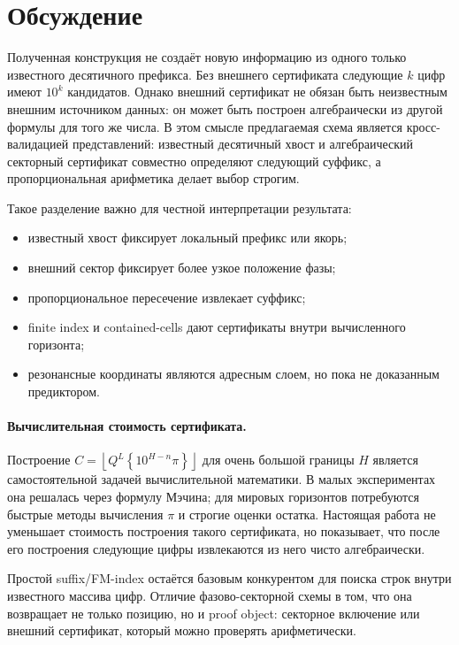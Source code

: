 \documentclass[11pt,a4paper]{article}
\newcommand{\fracpart}[1]{\left\{#1\right\}}
\newcommand{\floor}[1]{\left\lfloor #1 \right\rfloor}
\begin{document}
\section{Обсуждение}

Полученная конструкция не создаёт новую информацию из одного только известного десятичного префикса.  Без внешнего сертификата следующие $k$ цифр имеют $10^k$ кандидатов.  Однако внешний сертификат не обязан быть неизвестным внешним источником данных: он может быть построен алгебраически из другой формулы для того же числа.  В этом смысле предлагаемая схема является кросс-валидацией представлений: известный десятичный хвост и алгебраический секторный сертификат совместно определяют следующий суффикс, а пропорциональная арифметика делает выбор строгим.

Такое разделение важно для честной интерпретации результата:
\begin{itemize}[leftmargin=2em]
  \item известный хвост фиксирует локальный префикс или якорь;
  \item внешний сектор фиксирует более узкое положение фазы;
  \item пропорциональное пересечение извлекает суффикс;
  \item finite index и contained-cells дают сертификаты внутри вычисленного горизонта;
  \item резонансные координаты являются адресным слоем, но пока не доказанным предиктором.
\end{itemize}

\paragraph{Вычислительная стоимость сертификата.}
Построение $C=\floor{Q^L\fracpart{10^{H-n}\pi}}$ для очень большой границы $H$ является самостоятельной задачей вычислительной математики.  В малых экспериментах она решалась через формулу Мэчина; для мировых горизонтов потребуются быстрые методы вычисления $\pi$ и строгие оценки остатка.  Настоящая работа не уменьшает стоимость построения такого сертификата, но показывает, что после его построения следующие цифры извлекаются из него чисто алгебраически.

Простой suffix/FM-index остаётся базовым конкурентом для поиска строк внутри известного массива цифр.  Отличие фазово-секторной схемы в том, что она возвращает не только позицию, но и proof object: секторное включение или внешний сертификат, который можно проверять арифметически.
\end{document}
